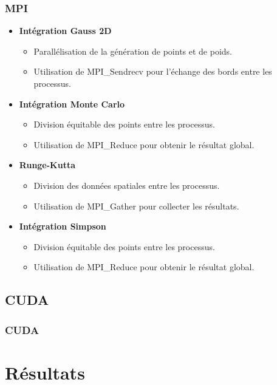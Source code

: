 \documentclass[10pt]{beamer}
\begin{document}
\begin{frame}
    \frametitle{MPI}
    \small
    \begin{itemize}
        \item \textbf{Intégration Gauss 2D}
            \begin{itemize}
                \item Parallélisation de la génération de points et de poids.
                \item Utilisation de MPI\_Sendrecv pour l'échange des bords entre les processus.
            \end{itemize}
        \item \textbf{Intégration Monte Carlo }
            \begin{itemize}
                \item Division équitable des points entre les processus.
                \item Utilisation de MPI\_Reduce pour obtenir le résultat global.
            \end{itemize}
        \item \textbf{Runge-Kutta}
            \begin{itemize}
                \item Division des données spatiales entre les processus.
                \item Utilisation de MPI\_Gather pour collecter les résultats.
            \end{itemize}
        \item \textbf{Intégration Simpson}
            \begin{itemize}
                \item Division équitable des points entre les processus.
                \item Utilisation de MPI\_Reduce pour obtenir le résultat global.
            \end{itemize}
    \end{itemize}
\end{frame}


  
  

\subsection{CUDA}
\begin{frame}
    \frametitle{CUDA}
\end{frame}

\section{Résultats}
\end{document}
